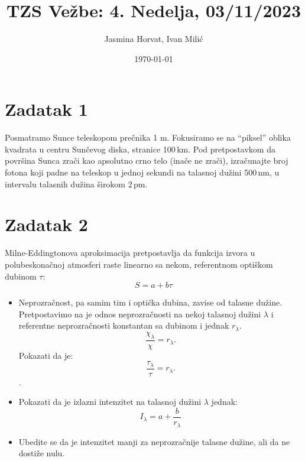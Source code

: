 \documentclass[12pt]{article}
\title{TZS Ve\v{z}be: 4. Nedelja, 03/11/2023}
\author{Jasmina Horvat, Ivan Mili\'{c}}
\date{\today}
\begin{document}
\maketitle

\section{Zadatak 1}
Posmatramo Sunce teleskopom pre\v{c}nika 1 m. Fokusiramo se na ``piksel'' oblika kvadrata u centru Sun\v{c}evog diska, stranice 100\,km. Pod pretpostavkom da povr\v{s}ina Sunca zra\v{c}i kao apsolutno crno telo (ina\v{c}e ne zra\v{c}i), izra\v{c}unajte broj fotona koji padne na teleskop u jednoj sekundi na talasnoj du\v{z}ini 500\,nm, u intervalu talasnih du\v{z}ina \v{s}irokom 2\,pm.

\section{Zadatak 2}
Milne-Eddingtonova aproksimacija pretpostavlja da funkcija izvora u polubeskona\v{c}noj atmosferi raste linearno sa nekom, referentnom opti\v{s}kom dubinom $\tau$:
\begin{equation}
S = a + b\tau
\end{equation}
\begin{itemize}
\item Neprozra\v{c}nost, pa samim tim i opti\v{c}ka dubina, zavise od talasne du\v{z}ine. Pretpostavimo na je odnos neprozra\v{c}nosti na nekoj talasnoj du\v{z}ini $\lambda$ i referentne neprozra\v{c}nosti konstantan sa dubinom i jednak $r_\lambda$.
\begin{equation}
\frac{\chi_\lambda}{\chi} = r_\lambda. 
\end{equation}
Pokazati da je:
\begin{equation}
\frac{\tau_\lambda}{\tau} = r_\lambda. 
\end{equation}.

\item Pokazati da je izlazni intenzitet na talasnoj du\v{z}ini $\lambda$ jednak:
\begin{equation}
I_\lambda = a + \frac{b}{r_\lambda}
\end{equation}

\item Ubedite se da je intenzitet manji za neprozra\v{c}nije talasne du\v{z}ine, ali da ne dosti\v{z}e nulu.
\end{itemize}
\end{document}
